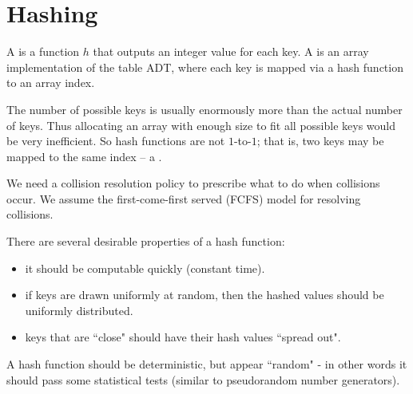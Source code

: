 \chapter{Hashing} %

\begin{Definition}
A  is a function $h$ that outputs an integer
value for each key. A  is an array implementation of
the table ADT, where each key is mapped via a hash function to an array
index. 
\end{Definition}

The number of possible keys is usually enormously more than
the actual number of keys. Thus allocating an array with enough size to
fit all possible keys would be very inefficient. So hash functions are
not $1$-to-$1$; that is, two keys may be mapped to the same index -- a . 

We need a collision resolution policy to prescribe what to do when collisions occur. 
We assume the first-come-first served (FCFS) model for resolving collisions.

There are several desirable properties of a hash function:
\begin{itemize}
\item it should be computable quickly (constant time).
\item if keys are drawn uniformly at random, then the hashed values
should be uniformly distributed. 
\item keys that are ``close" should have their hash values ``spread out". 
\end{itemize}
A hash function should be deterministic, but appear ``random" - in other 
words it should pass some statistical tests (similar to pseudorandom number generators). 

